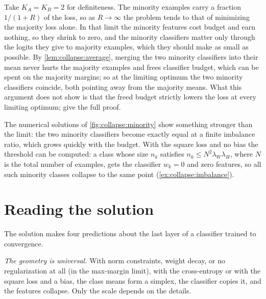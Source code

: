 \begin{refsection}
\begin{heuristic}
Take $K_A=K_B=2$ for definiteness. The minority examples carry a fraction $1/(1+R)$ of the loss, so as $R\to\infty$ the problem tends to that of minimizing the majority loss alone. In that limit the minority features cost budget and earn nothing, so they shrink to zero, and the minority classifiers matter only through the logits they give to majority examples, which they should make as small as possible. By \cref{lem:collapse:average}, merging the two minority classifiers into their mean never hurts the majority examples and frees classifier budget, which can be spent on the majority margins; so at the limiting optimum the two minority classifiers coincide, both pointing away from the majority means. What this argument does not show is that the freed budget strictly lowers the loss at every limiting optimum; \textcite{FangEtAl2021} give the full proof.
\end{heuristic}

The numerical solutions of \cref{fig:collapse:minority} show something stronger than the limit: the two minority classifiers become exactly equal at a finite imbalance ratio, which grows quickly with the budget. With the square loss and no bias the threshold can be computed: a class whose size $n_k$ satisfies $n_k\le N^2\lambda_W\lambda_H$, where $N$ is the total number of examples, gets the classifier $w_k=0$ and zero features, so all such minority classes collapse to the same point (\cref{ex:collapse:imbalance}).

\section{Reading the solution}\label{sec:collapse:reading}

The solution makes four predictions about the last layer of a classifier trained to convergence.

\emph{The geometry is universal.} With norm constraints, weight decay, or no regularization at all (in the max-margin limit), with the cross-entropy or with the square loss and a bias, the class means form a simplex, the classifier copies it, and the features collapse. Only the scale depends on the details.


\end{refsection}
